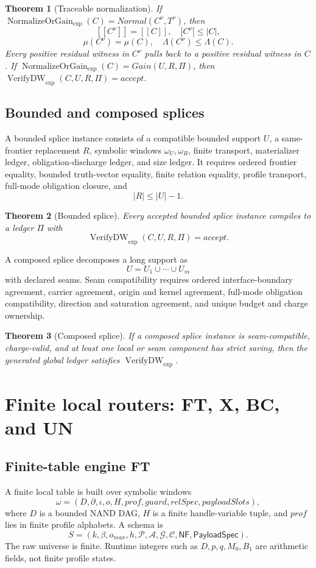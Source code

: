 \documentclass[10.5pt,a4paper]{article}
\newtheorem{theorem}{Theorem}[section]
\newcommand{\VerifyDW}{\operatorname{VerifyDW}_{\exp}}
\newcommand{\Norm}{\operatorname{NormalizeOrGain}_{\exp}}
\begin{document}
\begin{theorem}[Traceable normalization]
If \(\Norm(C)=Normal(C^\nu,T^\nu)\), then
\[
[[C^\nu]]=[[C]],\quad |C^\nu|\le |C|,
\]
\[
\mu(C^\nu)=\mu(C),\quad \Lambda(C^\nu)\le \Lambda(C).
\]
Every positive residual witness in \(C^\nu\) pulls back to a positive residual witness in \(C\). If \(\Norm(C)=Gain(U,R,\Pi)\), then \(\VerifyDW(C,U,R,\Pi)=accept\).
\end{theorem}

\subsection{Bounded and composed splices}
A bounded splice instance consists of a compatible bounded support \(U\), a same-frontier replacement \(R\), symbolic windows \(\omega_U,\omega_R\), finite transport, materializer ledger, obligation-discharge ledger, and size ledger. It requires ordered frontier equality, bounded truth-vector equality, finite relation equality, profile transport, full-mode obligation closure, and
\[
|R|\le |U|-1.
\]

\begin{theorem}[Bounded splice]
Every accepted bounded splice instance compiles to a ledger \(\Pi\) with
\[
\VerifyDW(C,U,R,\Pi)=accept.
\]
\end{theorem}

A composed splice decomposes a long support as
\[
U=U_1\cup\cdots\cup U_m
\]
with declared seams. Seam compatibility requires ordered interface-boundary agreement, carrier agreement, origin and kernel agreement, full-mode obligation compatibility, direction and saturation agreement, and unique budget and charge ownership.

\begin{theorem}[Composed splice]
If a composed splice instance is seam-compatible, charge-valid, and at least one local or seam component has strict saving, then the generated global ledger satisfies \(\VerifyDW\).
\end{theorem}

\section{Finite local routers: FT, X, BC, and UN}

\subsection{Finite-table engine FT}
A finite local table is built over symbolic windows
\[
\omega=(D,\partial,\iota,o,H,prof,guard,relSpec,payloadSlots),
\]
where \(D\) is a bounded NAND DAG, \(H\) is a finite handle-variable tuple, and \(prof\) lies in finite profile alphabets. A schema is
\[
S=(k,\beta,o_{max},h,\mathcal P,\mathcal A,\mathcal G,\mathcal C,\mathsf{NF},\mathsf{PayloadSpec}).
\]
The raw universe is finite. Runtime integers such as \(D,p,q,M_0,B_1\) are arithmetic fields, not finite profile states.
\end{document}
